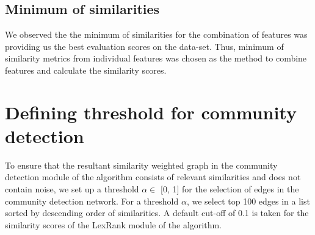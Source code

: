 \subsection{Minimum of similarities} \label{min}
We observed the the minimum of similarities for the combination of features was providing us the best evaluation scores on the data-set. Thus, minimum of similarity metrics from individual features was chosen as the method to combine features and calculate the similarity scores.


\section{Defining threshold for community detection}\label{thres}

To ensure that the resultant similarity weighted graph in the community detection module of the algorithm consists of relevant similarities and does not contain noise, we set up a threshold $ \alpha \in $ [0, 1] for the selection of edges in the community detection network. For a threshold $ \alpha $, we select top 100 edges in a list sorted by descending order of similarities. A default cut-off of 0.1 is taken for the similarity scores of the LexRank module of the algorithm.
